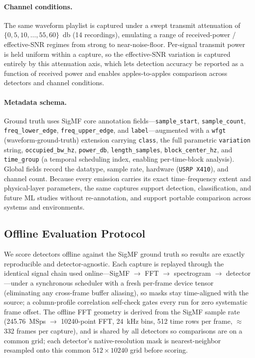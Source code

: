 \paragraph{Channel conditions.}
The same waveform playlist is captured under a swept transmit attenuation of
$\{0,5,10,\dots,55,60\}$~\si{\decibel} (\num{14} recordings), emulating a range of
received-power / effective-SNR regimes from strong to near-noise-floor. Per-signal
transmit power is held uniform within a capture, so the effective-SNR variation is
captured entirely by this attenuation axis, which lets detection accuracy be
reported as a function of received power and enables apples-to-apples comparison
across detectors and channel conditions.

\paragraph{Metadata schema.}
Ground truth uses SigMF core annotation fields---\texttt{sample\_start},
\texttt{sample\_count}, \texttt{freq\_lower\_edge}, \texttt{freq\_upper\_edge},
and \texttt{label}---augmented with a \texttt{wfgt} (waveform-ground-truth)
extension carrying \texttt{class}, the full parametric \texttt{variation} string,
\texttt{occupied\_bw\_hz}, \texttt{power\_db}, \texttt{length\_samples},
\texttt{block\_center\_hz}, and \texttt{time\_group} (a temporal scheduling index,
enabling per-time-block analysis). Global fields record the datatype, sample rate,
hardware (\texttt{USRP X410}), and channel count. Because every emission carries
its exact time--frequency extent and physical-layer parameters, the same captures
support detection, classification, and future ML studies without re-annotation,
and support portable comparison across systems and environments.

\subsection{Offline Evaluation Protocol}
\label{sec:eval}

We score detectors offline against the SigMF ground truth so results are exactly
reproducible and detector-agnostic. Each capture is replayed through the identical
signal chain used online---SigMF $\rightarrow$ FFT $\rightarrow$ spectrogram
$\rightarrow$ detector---under a synchronous scheduler with a fresh per-frame
device tensor (eliminating any cross-frame buffer aliasing), so masks stay
time-aligned with the source; a column-profile correlation self-check gates every
run for zero systematic frame offset. The offline FFT geometry is derived from the
SigMF sample rate (\SI{245.76}{MSps} $\rightarrow$ \num{10240}-point FFT,
\SI{24}{\kilo\hertz} bins, \num{512} time rows per frame, $\approx$\num{332}
frames per capture), and is shared by all detectors so comparisons are on a common
grid; each detector's native-resolution mask is nearest-neighbor resampled onto
this common $512\times10240$ grid before scoring.

